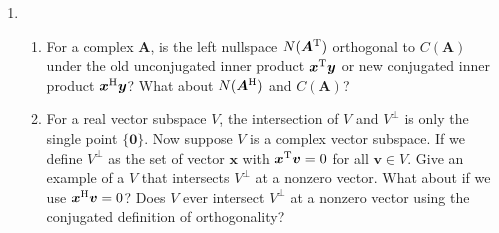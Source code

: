 \begin{enumerate}
\item
\begin{enumerate}
\item
For a complex $\bm A$, is the left nullspace $N(\bm A^{\mathrm T})$ orthogonal to $C(\bm A)$ under the old
unconjugated inner product $\bm x^{\mathrm T}\bm y$ or new conjugated inner product $\bm x^{\mathrm H}\bm y$? What about
$N(\bm A^{\mathrm H})$ and $C(\bm A)$?
\item
For a real vector subspace $V$, the intersection of $V$ and $V^{\perp}$ is only the single point $\{\bm 0\}$. Now suppose $V$ is a complex vector subspace. If we define $V^{\perp}$ as the set of vector $\bm x$ with $\bm x^{\mathrm T}\bm v=0$ for all $\bm v\in V$. Give an example of a $V$ that intersects $V^{\perp}$ at a nonzero vector. What about if we use $\bm x^{\mathrm H}\bm v=0$? Does $V$ ever intersect $V^{\perp}$ at a nonzero vector using the conjugated definition of orthogonality?
\end{enumerate}
\end{enumerate}